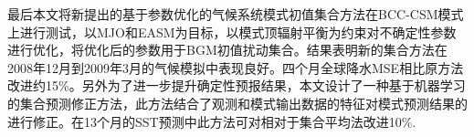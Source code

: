最后本文将新提出的基于参数优化的气候系统模式初值集合方法在BCC-CSM模式上进行测试，以MJO和EASM为目标，以模式顶辐射平衡为约束对不确定性参数进行优化，将优化后的参数用于BGM初值扰动集合。结果表明新的集合方法在2008年12月到2009年3月的气候模拟中表现良好。四个月全球降水MSE相比原方法改进约15\%。另外为了进一步提升确定性预报结果，本文设计了一种基于机器学习的集合预测修正方法，此方法结合了观测和模式输出数据的特征对模式预测结果的进行修正。在13个月的SST预测中此方法可对相对于集合平均法改进10\%.


\begin{figure}[H]
\label{fig:u850freq}
\centering
{}
\end{figure}
